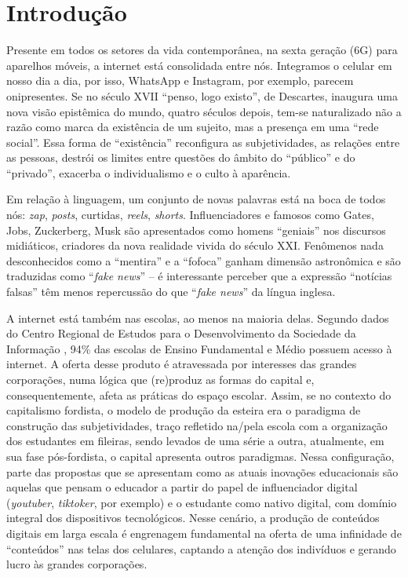 \documentclass[portuguese]{textolivre}
\begin{document}
\section{Introdução}
Presente em todos os setores da vida contemporânea, na sexta geração (6G) para aparelhos móveis, a internet está consolidada entre nós. Integramos o celular em nosso dia a dia, por isso, WhatsApp e Instagram, por exemplo, parecem onipresentes. Se no século XVII ``penso, logo existo'', de Descartes, inaugura uma nova visão epistêmica do mundo, quatro séculos depois, tem-se naturalizado não a razão como marca da existência de um sujeito, mas a presença em uma ``rede social''. Essa forma de ``existência'' reconfigura as subjetividades, as relações entre as pessoas, destrói os limites entre questões do âmbito do ``público'' e do ``privado'', exacerba o individualismo e o culto à aparência. 

Em relação à linguagem, um conjunto de novas palavras está na boca de todos nós: \textit{zap}, \textit{posts}, curtidas, \textit{reels}, \textit{shorts}. Influenciadores e famosos como Gates, Jobs, Zuckerberg, Musk são apresentados como homens ``geniais'' nos discursos midiáticos, criadores da nova realidade vivida do século XXI. Fenômenos nada desconhecidos como a ``mentira'' e a ``fofoca'' ganham dimensão astronômica e são traduzidas como ``\textit{fake news}'' – é interessante perceber que a expressão ``notícias falsas'' têm menos repercussão do que ``\textit{fake news}'' da língua inglesa.

A internet está também nas escolas, ao menos na maioria delas. Segundo dados do Centro Regional de Estudos para o Desenvolvimento da Sociedade da Informação \cite{centro_regional_de_estudos_para_o_desenvolvimento_da_sociedade_da_informacao_tic_2023}, 94\% das escolas de Ensino Fundamental e Médio possuem acesso à internet. A oferta desse produto é atravessada por interesses das grandes corporações, numa lógica que (re)produz as formas do capital e, consequentemente, afeta as práticas do espaço escolar. Assim, se no contexto do capitalismo fordista, o modelo de produção da esteira era o paradigma de construção das subjetividades, traço refletido na/pela escola com a organização dos estudantes em fileiras, sendo levados de uma série a outra, atualmente, em sua fase pós-fordista, o capital apresenta outros paradigmas. Nessa configuração, parte das propostas que se apresentam como as atuais inovações educacionais são aquelas que pensam o educador a partir do papel de influenciador digital (\textit{youtuber}, \textit{tiktoker}, por exemplo) e o estudante como nativo digital, com domínio integral dos dispositivos tecnológicos. Nesse cenário, a produção de conteúdos digitais em larga escala é engrenagem fundamental na oferta de uma infinidade de ``conteúdos'' nas telas dos celulares, captando a atenção dos indivíduos e gerando lucro às grandes corporações.
\end{document}
